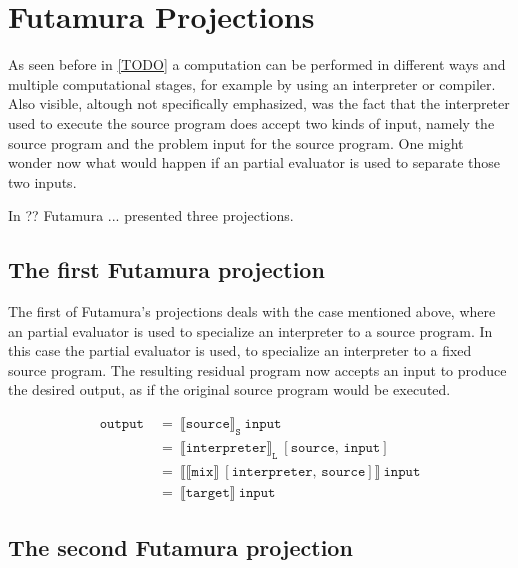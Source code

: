 
\section{Futamura Projections}\label{sec:futamura}

As seen before in \ref{TODO} a computation can be performed in different ways and multiple computational stages, for example by using an interpreter or compiler.
Also visible, altough not specifically emphasized, was the fact that the interpreter used to execute the source program does accept two kinds of input, namely the source program and the problem input for the source program.
One might wonder now what would happen if an partial evaluator is used to separate those two inputs.

In ?? Futamura ... presented three projections.


\subsection{The first Futamura projection}\label{sec:futamura1}

The first of Futamura's projections deals with the case mentioned above, where an partial evaluator is used to specialize an interpreter to a source program. %
In this case the partial evaluator is used, to specialize an interpreter to a fixed source program.
The resulting residual program now accepts an input to produce the desired output, as if the original source program would be executed.

\begin{align*}
  \mathtt{output}\ &=\ \llbracket \mathtt{source} \rrbracket_{\mathtt{S}}\ \mathtt{input} \\
                   &=\ \llbracket \mathtt{interpreter} \rrbracket_{\mathtt{L}}\ [\mathtt{source},\, \mathtt{input}] \\
                   &=\ \llbracket \llbracket \mathtt{mix} \rrbracket\ [\mathtt{interpreter},\, \mathtt{source}] \rrbracket\ \mathtt{input} \\
                   &=\ \llbracket \mathtt{target} \rrbracket\ \mathtt{input}
\end{align*}


\subsection{The second Futamura projection}\label{sec:futamura2}

